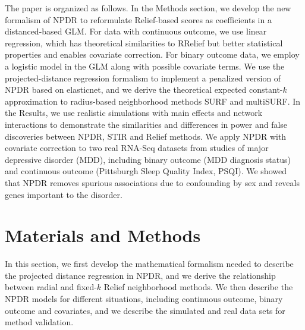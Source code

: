 \documentclass[10pt]{article}
\begin{document}

The paper is organized as follows.
In the Methods section, we develop the new formalism of NPDR to reformulate Relief-based scores as coefficients in a distanced-based GLM.
For data with continuous outcome, we use linear regression, which has theoretical similarities to RRelief but better statistical properties and enables covariate correction.
For binary outcome data, we employ a logistic model in the GLM along with possible covariate terms.
We use the projected-distance regression formalism to implement a penalized version of NPDR based on elasticnet, and we derive the theoretical expected constant-$k$ approximation to radius-based neighborhood methods SURF and multiSURF. 
In the Results, we use realistic simulations with main effects and network interactions to demonstrate the similarities and differences in power and false discoveries between NPDR, STIR and Relief methods.
We apply NPDR with covariate correction to two real RNA-Seq datasets from studies of major depressive disorder (MDD), including binary outcome (MDD diagnosis status) and continuous outcome (Pittsburgh Sleep Quality Index, PSQI).
We showed that NPDR removes spurious associations due to confounding by sex and reveals genes important to the disorder.



\section{Materials and Methods}
In this section, we first develop the mathematical formalism needed to describe the projected distance regression in NPDR, and we derive the relationship between radial and fixed-$k$ Relief neighborhood methods. We then describe the NPDR models for different situations, including continuous outcome, binary outcome and covariates, and we describe the simulated and real data sets for method validation. 

\def\ri{R_i}
\def\rj{R_j}
\def\kmi{k_{M_i}}
\def\khi{k_{H_i}}
\def\hji{H_{j_i}}
\def\ma{\overline{M}_a}
\def\ha{\overline{H}_a}
\def\mnu{M_\nu}
\def\hnu{H_\nu}
\def\myd{\text{diff}}
\def\ka{\bar{k}_\alpha}
\end{document}

